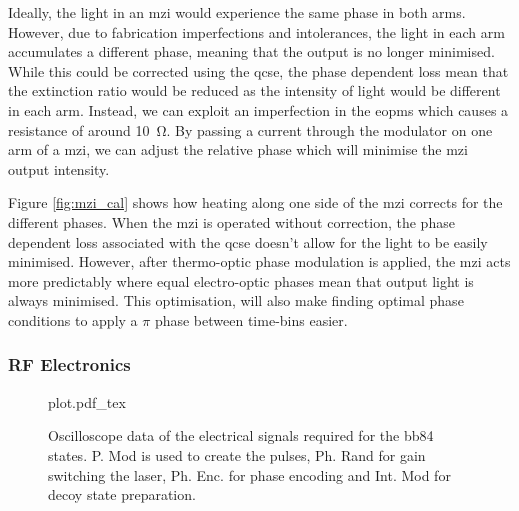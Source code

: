 

Ideally, the light in an \ac{mzi} would experience the same phase in both arms. However, due to fabrication imperfections and intolerances, the light in each arm accumulates a different phase, meaning that the output is no longer minimised. While this could be corrected using the \ac{qcse}, the phase dependent loss mean that the extinction ratio would be reduced as the intensity of light would be different in each arm. Instead, we can exploit an imperfection in the \acp{eopm} which causes a resistance of around \SI{10}{\ohm}. By passing a current through the modulator on one arm of a \ac{mzi}, we can adjust the relative phase which will minimise the \ac{mzi} output intensity.

Figure \ref{fig:mzi_cal} shows how heating along one side of the \ac{mzi} corrects for the different phases. When the \ac{mzi} is operated without correction, the phase dependent loss associated with the \ac{qcse} doesn't allow for the light to be easily minimised. However, after thermo-optic phase modulation is applied, the \ac{mzi} acts more predictably where equal electro-optic phases mean that output light is always minimised. This optimisation, will also make finding optimal phase conditions to apply a $\pi$ phase between time-bins easier.



\subsubsection{RF Electronics}

\begin{figure}[tbp]
	\centering
	\def\svgwidth{\textwidth} 
	{plot.pdf_tex}
	\caption[Electrical signals for BB84 state generation]{Oscilloscope data of the electrical signals required for the \acs{bb84} states. P. Mod is used to create the pulses, Ph. Rand for gain switching the laser, Ph. Enc. for phase encoding and Int. Mod for decoy state preparation.}
	\label{fig:elec_signals}
\end{figure}

